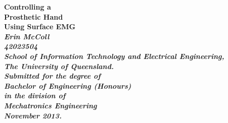 \documentclass[12pt,openany,a4paper]{book}
\renewcommand{\baselinestretch}{1.2}	%
\begin{document}
\frontmatter

\begin{titlepage}
\renewcommand{\baselinestretch}{1.0}
\begin{figure}[h]
\centering
\end{figure}
\begin{center}
\vspace*{35mm}
\Huge\bf
		Controlling a  \\
		Prosthetic Hand \\
		Using Surface EMG\\
\vspace{20mm}
\large\sl
		Erin McColl\\
		42023504
		\bigskip\\
\rm
		School of Information Technology and Electrical Engineering,\\
		The University of Queensland.\\
\vspace{30mm}
		Submitted for the degree of\\
		Bachelor of Engineering (Honours)
		\smallskip\\
\normalsize
		in the division of\\
		Mechatronics Engineering
		\medskip\\
\large
		November 2013.		
\end{center}
\end{titlepage}

\pagestyle{fancy}
\fancyfoot{}
\fancyhead{}
\renewcommand{\headrulewidth}{0pt}
\fancyfoot[C] {\footnotesize \thepage}

\cleardoublepage
\end{document}
